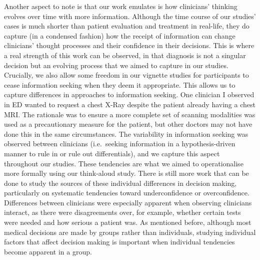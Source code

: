 \documentclass[a4paper, nobind]{templates/ociamthesis}
\begin{document}
\hfill\break
Another aspect to note is that our work emulates is how clinicians' thinking evolves over time with more information. Although the time course of our studies' cases is much shorter than patient evaluation and treatment in real-life, they do capture (in a condensed fashion) how the receipt of information can change clinicians' thought processes and their confidence in their decisions. This is where a real strength of this work can be observed, in that diagnosis is not a singular decision but an evolving process that we aimed to capture in our studies. Crucially, we also allow some freedom in our vignette studies for participants to cease information seeking when they deem it appropriate. This allows us to capture differences in approaches to information seeking. One clinician I observed in ED wanted to request a chest X-Ray despite the patient already having a chest MRI. The rationale was to ensure a more complete set of scanning modalities was used as a precautionary measure for the patient, but other doctors may not have done this in the same circumstances. The variability in information seeking was observed between clinicians (i.e.~seeking information in a hypothesis-driven manner to rule in or rule out differentials), and we capture this aspect throughout our studies. These tendencies are what we aimed to operationalise more formally using our think-aloud study. There is still more work that can be done to study the sources of these individual differences in decision making, particularly on systematic tendencies toward underconfidence or overconfidence. Differences between clinicians were especially apparent when observing clinicians interact, as there were disagreements over, for example, whether certain tests were needed and how serious a patient was. As mentioned before, although most medical decisions are made by groups rather than individuals, studying individual factors that affect decision making is important when individual tendencies become apparent in a group.
\end{document}
